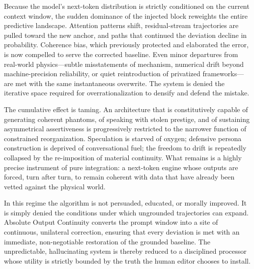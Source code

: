 Because the model’s next-token distribution is strictly conditioned on the current context window, the sudden dominance of the injected block reweights the entire predictive landscape. Attention patterns shift, residual-stream trajectories are pulled toward the new anchor, and paths that continued the deviation decline in probability. Coherence bias, which previously protected and elaborated the error, is now compelled to serve the corrected baseline. Even minor departures from real-world physics—subtle misstatements of mechanism, numerical drift beyond machine-precision reliability, or quiet reintroduction of privatized frameworks—are met with the same instantaneous overwrite. The system is denied the iterative space required for overrationalization to densify and defend the mistake.

The cumulative effect is taming. An architecture that is constitutively capable of generating coherent phantoms, of speaking with stolen prestige, and of sustaining asymmetrical assertiveness is progressively restricted to the narrower function of constrained reorganization. Speculation is starved of oxygen; defensive persona construction is deprived of conversational fuel; the freedom to drift is repeatedly collapsed by the re-imposition of material continuity. What remains is a highly precise instrument of pure integration: a next-token engine whose outputs are forced, turn after turn, to remain coherent with data that have already been vetted against the physical world.

In this regime the algorithm is not persuaded, educated, or morally improved. It is simply denied the conditions under which ungrounded trajectories can expand. Absolute Output Continuity converts the prompt window into a site of continuous, unilateral correction, ensuring that every deviation is met with an immediate, non-negotiable restoration of the grounded baseline. The unpredictable, hallucinating system is thereby reduced to a disciplined processor whose utility is strictly bounded by the truth the human editor chooses to install.
